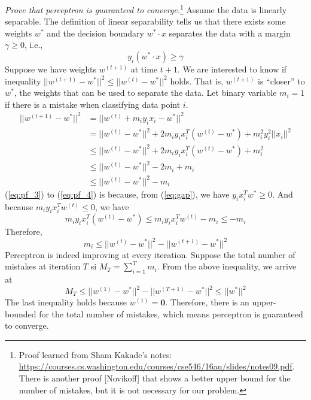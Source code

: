 \documentclass[12pt]{article}
\theoremstyle{definition}
\begin{document}
\emph{Prove that perceptron is guaranteed to converge.}\footnote{Proof learned from Sham Kakade's notes: \url{https://courses.cs.washington.edu/courses/cse546/16au/slides/notes09.pdf}. There is another proof [Novikoff] that shows a better upper bound for the number of mistakes, but it is not necessary for our problem.} Assume the data is linearly separable. The definition of linear separability tells us that there exists some weights $w^*$ and the decision boundary $w^*\cdot x$ separates the data with a margin $\gamma\geq 0$, i.e.,
\begin{equation}\label{eq:gap}
  y_i(w^*\cdot x)\geq \gamma
\end{equation}
Suppose we have weights $w^{(t+1)}$ at time $t+1$. We are interested to know if inequality $||w^{(t+1)}-w^*||^2\leq||w^{(t)}-w^*||^2$ holds. That is, $w^{(t+1)}$ is ``closer'' to $w^*$, the weights that can be used to separate the data. Let binary variable $m_i=1$ if there is a mistake when classifying data point $i$.
\begin{align}
  ||w^{(t+1)}-w^*||^2&=||w^{(t)}+m_iy_ix_i-w^*||^2\\
  &=||w^{(t)}-w^*||^2+2m_iy_ix_i^T(w^{(t)}-w^*)+m_i^2y_i^2||x_i||^2\\
  \label{eq:pf_3}&\leq ||w^{(t)}-w^*||^2+2m_iy_ix_i^T(w^{(t)}-w^*)+m_i^2\\
  \label{eq:pf_4}&\leq ||w^{(t)}-w^*||^2-2m_i+m_i\\
  &\leq ||w^{(t)}-w^*||^2-m_i
\end{align}
(\ref{eq:pf_3}) to (\ref{eq:pf_4}) is because, from (\ref{eq:gap}), we have $y_ix_i^Tw^*\geq 0$. And because $m_iy_ix_i^Tw^{(t)}\leq 0$, we have
\begin{equation}
  m_iy_ix_i^T(w^{(t)}-w^*)\leq m_iy_ix_i^Tw^{(t)}-m_i\leq -m_i
\end{equation}
Therefore,
\begin{equation}
  m_i\leq||w^{(t)}-w^*||^2-||w^{(t+1)}-w^*||^2
\end{equation}
Perceptron is indeed improving at every iteration. Suppose the total number of mistakes at iteration $T$ si $M_T=\sum_{i=1}^Tm_i$. From the above inequality, we arrive at
\begin{equation}
  M_T\leq||w^{(1)}-w^*||^2-||w^{(T+1)}-w^*||^2\leq ||w^*||^2
\end{equation}
The last inequality holds because $w^{(1)}=\bm{0}$. Therefore, there is an upper-bounded for the total number of mistakes, which means perceptron is guaranteed to converge.
\end{document}
